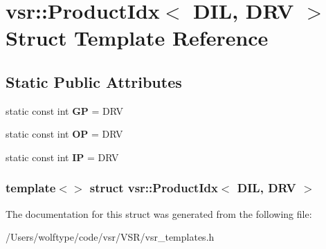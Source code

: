 \hypertarget{structvsr_1_1_product_idx_3_01_d_i_l_00_01_d_r_v_01_4}{\section{vsr\-:\-:Product\-Idx$<$ D\-I\-L, D\-R\-V $>$ Struct Template Reference}
\label{structvsr_1_1_product_idx_3_01_d_i_l_00_01_d_r_v_01_4}
}
\subsection*{Static Public Attributes}
\begin{DoxyCompactItemize}
\item 
\hypertarget{structvsr_1_1_product_idx_3_01_d_i_l_00_01_d_r_v_01_4_ac2e997635aa4a61db57a15906290e236}{static const int {\bfseries G\-P} = D\-R\-V}\label{structvsr_1_1_product_idx_3_01_d_i_l_00_01_d_r_v_01_4_ac2e997635aa4a61db57a15906290e236}

\item 
\hypertarget{structvsr_1_1_product_idx_3_01_d_i_l_00_01_d_r_v_01_4_a5e3fc79ba70cd808e34b39220572048c}{static const int {\bfseries O\-P} = D\-R\-V}\label{structvsr_1_1_product_idx_3_01_d_i_l_00_01_d_r_v_01_4_a5e3fc79ba70cd808e34b39220572048c}

\item 
\hypertarget{structvsr_1_1_product_idx_3_01_d_i_l_00_01_d_r_v_01_4_ae43d2a98dce779cf5013abd71c9553f5}{static const int {\bfseries I\-P} = D\-R\-V}\label{structvsr_1_1_product_idx_3_01_d_i_l_00_01_d_r_v_01_4_ae43d2a98dce779cf5013abd71c9553f5}

\end{DoxyCompactItemize}
\subsubsection*{template$<$$>$ struct vsr\-::\-Product\-Idx$<$ D\-I\-L, D\-R\-V $>$}



The documentation for this struct was generated from the following file\-:\begin{DoxyCompactItemize}
\item 
/\-Users/wolftype/code/vsr/\-V\-S\-R/vsr\-\_\-templates.\-h\end{DoxyCompactItemize}
